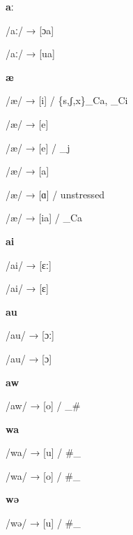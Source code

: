 \begin{center}\textbf{aː}\end{center}
\begin{multicols}{4}
\noindent /aː/ → [ɔa]

\noindent /aː/ → [ua]
\end{multicols}


\begin{center}\textbf{æ}\end{center}
\begin{multicols}{4}
\noindent /æ/ → [i] / \{s,ʃ,x\}\_Ca, \_Ci

\noindent /æ/ → [e]

\noindent /æ/ → [e] / \_j

\noindent /æ/ → [a]

\noindent /æ/ → [ɑ] / unstressed

\noindent /æ/ → [ia] / \_Ca
\end{multicols}


\begin{center}\textbf{ai}\end{center}
\begin{multicols}{4}
\noindent /ai/ → [ɛː]

\noindent /ai/ → [ɛ]
\end{multicols}


\begin{center}\textbf{au}\end{center}
\begin{multicols}{4}
\noindent /au/ → [ɔː]

\noindent /au/ → [ɔ]
\end{multicols}


\begin{center}\textbf{aw}\end{center}
\begin{multicols}{4}
\noindent /aw/ → [o] / \_\#
\end{multicols}


\begin{center}\textbf{wa}\end{center}
\begin{multicols}{4}
\noindent /wa/ → [u] / \#\_

\noindent /wa/ → [o] / \#\_
\end{multicols}


\begin{center}\textbf{wə}\end{center}
\begin{multicols}{4}
\noindent /wə/ → [u] / \#\_
\end{multicols}


